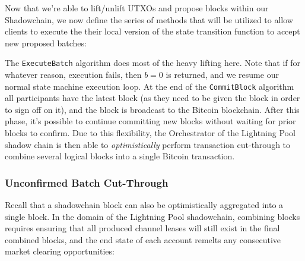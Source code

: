\documentclass[10pt,a4paper]{article}
\theoremstyle{definition}
\begin{document}
Now that we're able to lift/unlift UTXOs and propose blocks within our
Shadowchain, we now define the series of methods that will be utilized to allow
clients to execute the their local version of the state transition function to
accept new proposed batches:
\begin{pchstack}[boxed,center, space=1em]
\end{pchstack}

The \texttt{ExecuteBatch} algorithm does most of the heavy lifting here. Note
that if for whatever reason, execution fails, then $b=0$ is returned, and we
resume our normal state machine execution loop. At the end of the
\texttt{CommitBlock} algorithm all participants have the latest block (as they
need to be given the block in order to sign off on it), and the block is
broadcast to the Bitcoin blockchain. After this phase, it's possible to
continue committing new blocks without waiting for prior blocks to confirm. Due
to this flexibility, the Orchestrator of the Lightning Pool shadow chain is
then able to \emph{optimistically} perform transaction cut-through to combine
several logical blocks into a single Bitcoin transaction.


\subsubsection{Unconfirmed Batch Cut-Through}

Recall that a shadowchain block can also be optimistically aggregated into a
single block. In the domain of the Lightning Pool shadowchain, combining blocks
requires ensuring that all produced channel leases will still exist in the
final combined blocks, and the end state of each account remelts any
consecutive market clearing opportunities:

\begin{pchstack}[boxed,center, space=1em]
\end{pchstack}
\end{document}
